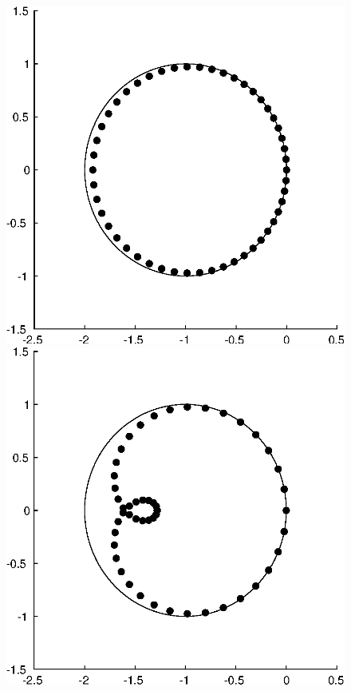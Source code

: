 \documentclass[twocolumn,10pt]{article}
\begin{document}
\begin{figure}[H]
    \centering
    \begin{minipage}[t]{0.48\linewidth}
        \centering
        \includegraphics[width=0.95\linewidth]{figures/ex_12_82_mu=0.8.eps}
    \end{minipage}
    \begin{minipage}[t]{0.48\linewidth}
        \centering
        \includegraphics[width=0.95\linewidth]{figures/ex_12_82_mu=1.6.eps}

\end{minipage}
\end{figure}
\end{document}
